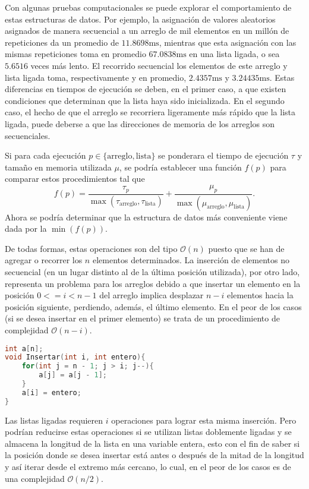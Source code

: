 \documentclass[paper=leter, fontsize=11pt]{scrartcl}
\numberwithin{equation}{section}		%
\numberwithin{figure}{section}			%
\numberwithin{table}{section}				%
\begin{document}
Con algunas pruebas computacionales se puede explorar el comportamiento de estas estructuras de datos. Por ejemplo, la asignación de valores aleatorios asignados de manera secuencial a un arreglo de mil elementos en un millón de repeticiones da un promedio de $11.8698 \text{ms}$, mientras que esta asignación con las mismas repeticiones toma en promedio $67.0838 \text{ms}$ en una lista ligada, o sea $5.6516$ veces más lento. El recorrido secuencial los elementos de este arreglo y lista ligada toma, respectivamente y en promedio, $2.4357 \text{ms}$ y $3.24435 \text{ms}$. Estas diferencias en tiempos de ejecución se deben, en el primer caso, a que existen condiciones que determinan que la lista haya sido inicializada. En el segundo caso, el hecho de que el arreglo se recorriera ligeramente más rápido que la lista ligada, puede deberse a que las direcciones de memoria de los arreglos son secuenciales.

Si para cada ejecución $p \in \{\text{arreglo}, \text{lista}\}$ se ponderara el tiempo de ejecución $\tau$ y tamaño en memoria utilizada $\mu$, se podría establecer una función $f(p)$ para comparar estos procedimientos tal que 
$$f(p) = \frac{\tau_p}{\max(\tau_{\text{arreglo}}, \tau_{\text{lista}})} + \frac{\mu_p}{\max(\mu_{\text{arreglo}}, \mu_{\text{lista}})}.$$ 
Ahora se podría determinar que la estructura de datos más conveniente viene dada por la $\min(f(p))$.

De todas formas, estas operaciones son del tipo $\mathcal{O}(n)$ puesto que se han de agregar o recorrer los $n$ elementos determinados. La inserción de elementos no secuencial (en un lugar distinto al de la última posición utilizada), por otro lado, representa un problema para los arreglos debido a que insertar un elemento en la posición $0 <= i < n - 1$ del arreglo implica desplazar $n - i$ elementos hacia la posición siguiente, perdiendo, además, el último elemento. En el peor de los casos (si se desea insertar en el primer elemento) se trata de un procedimiento de complejidad $\mathcal{O}(n - i)$.\nocite{listas}

\begin{lstlisting}[language=C++, caption=Función para insertar un entero en la posición $i$ de un arreglo de $n$ elementos.]
int a[n];
void Insertar(int i, int entero){
	for(int j = n - 1; j > i; j--){
		a[j] = a[j - 1];
	}
	a[i] = entero;
}
\end{lstlisting}

Las listas ligadas requieren $i$ operaciones para lograr esta misma inserción. Pero podrían reducirse estas operaciones si se utilizan listas doblemente ligadas y se almacena la longitud de la lista en una variable entera, esto con el fin de saber si la posición donde se desea insertar está antes o después de la mitad de la longitud y así iterar desde el extremo más cercano, lo cual, en el peor de los casos es de una complejidad $\mathcal{O}(n / 2)$.
\end{document}
